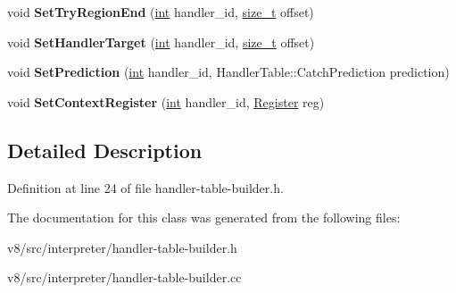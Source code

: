 \begin{DoxyCompactItemize}
void {\bfseries Set\+Try\+Region\+End} (\mbox{\hyperlink{classint}{int}} handler\+\_\+id, \mbox{\hyperlink{classsize__t}{size\+\_\+t}} offset)
\item 
\mbox{\label{classv8_1_1internal_1_1interpreter_1_1HandlerTableBuilder_a90857c0553edd5825a80d426f30dfe3c}} 
void {\bfseries Set\+Handler\+Target} (\mbox{\hyperlink{classint}{int}} handler\+\_\+id, \mbox{\hyperlink{classsize__t}{size\+\_\+t}} offset)
\item 
\mbox{\label{classv8_1_1internal_1_1interpreter_1_1HandlerTableBuilder_a8949ce0536626ace7e8c167e81b601c1}} 
void {\bfseries Set\+Prediction} (\mbox{\hyperlink{classint}{int}} handler\+\_\+id, Handler\+Table\+::\+Catch\+Prediction prediction)
\item 
\mbox{\label{classv8_1_1internal_1_1interpreter_1_1HandlerTableBuilder_a3918e584ac50ae5b8df7b127111d27a1}} 
void {\bfseries Set\+Context\+Register} (\mbox{\hyperlink{classint}{int}} handler\+\_\+id, \mbox{\hyperlink{classv8_1_1internal_1_1interpreter_1_1Register}{Register}} reg)
\end{DoxyCompactItemize}


\subsection{Detailed Description}


Definition at line 24 of file handler-\/table-\/builder.\+h.



The documentation for this class was generated from the following files\+:\begin{DoxyCompactItemize}
\item 
v8/src/interpreter/handler-\/table-\/builder.\+h\item 
v8/src/interpreter/handler-\/table-\/builder.\+cc\end{DoxyCompactItemize}
